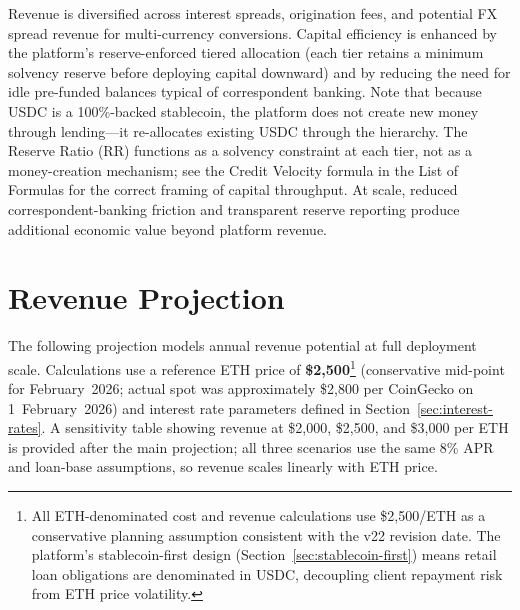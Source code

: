 \documentclass[12pt, a4paper]{report}
\begin{document}
Revenue is diversified across interest spreads, origination fees, and potential FX spread revenue for multi-currency conversions. Capital efficiency is enhanced by the platform's reserve-enforced tiered allocation (each tier retains a minimum solvency reserve before deploying capital downward) and by reducing the need for idle pre-funded balances typical of correspondent banking. Note that because USDC is a 100\%-backed stablecoin, the platform does not create new money through lending---it re-allocates existing USDC through the hierarchy. The Reserve Ratio (RR) functions as a solvency constraint at each tier, not as a money-creation mechanism; see the Credit Velocity formula in the List of Formulas for the correct framing of capital throughput. At scale, reduced correspondent-banking friction and transparent reserve reporting produce additional economic value beyond platform revenue.

\section{Revenue Projection}

The following projection models annual revenue potential at full deployment scale. Calculations use a reference ETH price of \textbf{\$2,500}\footnote{All ETH-denominated cost and revenue calculations use \$2{,}500/ETH as a conservative planning assumption consistent with the v22 revision date. The platform's stablecoin-first design (Section~\ref{sec:stablecoin-first}) means retail loan obligations are denominated in USDC, decoupling client repayment risk from ETH price volatility.} (conservative mid-point for February~2026; actual spot was approximately \$2,800 per CoinGecko on 1~February~2026) and interest rate parameters defined in Section~\ref{sec:interest-rates}. A sensitivity table showing revenue at \$2,000, \$2,500, and \$3,000 per ETH is provided after the main projection; all three scenarios use the same 8\% APR and loan-base assumptions, so revenue scales linearly with ETH price.
\end{document}
